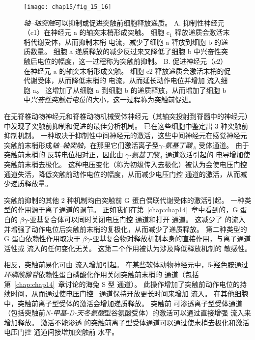 \begin{figure}[htbp]
	\centering
	\texttt{[image: chap15/fig\_15\_16]}
	\caption{\textit{轴–轴突触}可以抑制或促进突触前细胞释放递质。
		A. 抑制性神经元（c1）在神经元 a 的轴突末梢形成突触。
		细胞 c$_1$ 释放递质会激活末梢代谢受体，从而抑制末梢  电流，减少了细胞 a 释放到细胞 b 的递质数量。
		细胞 a 递质释放的减少反过来又降低了细胞 b 中兴奋性突触后电位的幅度，这一过程称为突触前抑制。
		B. 促进神经元（c2）在神经元 a 的轴突末梢形成突触。
		细胞 c2 释放递质会激活末梢的促代谢受体，从而降低末梢的  电流，从而延长动作电位并增加  流入细胞 a。
		这增加了从细胞 a 到细胞 b 的递质释放，从而增加了细胞 b 中\textit{兴奋性突触后电位}的大小，这一过程称为突触前促进。}
	\label{fig:15_16}
\end{figure}



在无脊椎动物神经元和脊椎动物机械受体神经元（其轴突投射到脊髓中的神经元）中发现了突触前抑制和促进的最佳分析机制。
已在这些细胞中鉴定出 3 种突触前抑制机制。
一种取决于抑制性中间神经元的激活，这些中间神经元在感觉神经元突触前末梢形成\textit{轴–轴突触}，在那里它们激活离子型\textit{$\gamma$-氨基丁酸}$_A$ 受体通道。
由于突触前末梢的  反转电位相对正，因此由 \textit{$\gamma$-氨基丁酸}$_A$ 通道激活引起的  电导增加使突触前末梢去极化。
这种电压变化（称为初级传入去极化）被认为会使电压门控  通道失活，降低突触前动作电位的幅度，从而减少电压门控  通道的激活，从而减少递质释放量。


突触前抑制的其他 2 种机制均由突触前 G 蛋白偶联代谢受体的激活引起。
一种类型的作用源于离子通道的调节。
正如我们在第~\ref{chap:chap14}~章中看到的，G 蛋白的 $\beta\gamma$-亚基复合体可以同时关闭电压门控  通道和打开  通道。
这减少了  的流入并增强了动作电位后突触前末梢的复极化，从而减少了递质释放。
第二种类型的 G 蛋白依赖性作用取决于 $\beta\gamma$-亚基复合物对释放机制本身的直接作用，与离子通道活性或  流入的任何变化无关。
这第二个作用被认为涉及降低释放机制的  敏感性。


相反，突触前易化可由  流入增加引起。
在某些软体动物神经元中，5-羟色胺通过\textit{环磷酸腺苷}依赖性蛋白磷酸化作用关闭突触前末梢的  通道（包括第~\ref{chap:chap14}~章讨论的海兔 S 型  通道）。
此操作增加了突触前动作电位的持续时间，从而通过使电压门控~ 通道保持开放更长时间来增加  流入。
在其他细胞中，突触前离子型受体的激活会增加递质释放。
突触前  可渗透离子型受体通道（包括突触前\textit{N-甲基-D-天冬氨酸}型谷氨酸受体）的激活可以通过直接增强  流入来增加释放。
激活不能渗透  的突触前离子型受体通道可以通过使末梢去极化和激活电压门控  通道间接增加突触前  水平。


